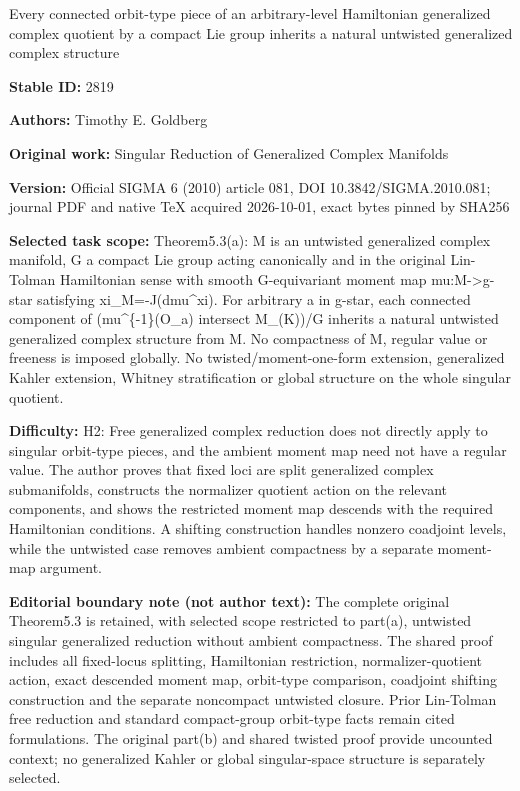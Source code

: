 \documentclass[11pt]{article}
\numberwithin{equation}{section}
\begin{document}
\begin{center}\Large Every connected orbit-type piece of an arbitrary-level Hamiltonian generalized complex quotient by a compact Lie group inherits a natural untwisted generalized complex structure\end{center}
\noindent\textbf{Stable ID:} 2819\par
\noindent\textbf{Authors:} Timothy E. Goldberg\par
\noindent\textbf{Original work:} Singular Reduction of Generalized Complex Manifolds\par
\noindent\textbf{Version:} Official SIGMA 6 (2010) article 081, DOI 10.3842/SIGMA.2010.081; journal PDF and native TeX acquired 2026-10-01, exact bytes pinned by SHA256\par
\noindent\textbf{Selected task scope:} Theorem5.3(a): M is an untwisted generalized complex manifold, G a compact Lie group acting canonically and in the original Lin-Tolman Hamiltonian sense with smooth G-equivariant moment map mu:M->g-star satisfying xi\_M=\allowbreak{}-J(dmu\textasciicircum{}xi). For arbitrary a in g-star, each connected component of (mu\textasciicircum{}\{-1\}(O\_a) intersect M\_(K))/G inherits a natural untwisted generalized complex structure from M. No compactness of M, regular value or freeness is imposed globally. No twisted/moment-one-form extension, generalized Kahler extension, Whitney stratification or global structure on the whole singular quotient.\par
\noindent\textbf{Difficulty:} H2: Free generalized complex reduction does not directly apply to singular orbit-type pieces, and the ambient moment map need not have a regular value. The author proves that fixed loci are split generalized complex submanifolds, constructs the normalizer quotient action on the relevant components, and shows the restricted moment map descends with the required Hamiltonian conditions. A shifting construction handles nonzero coadjoint levels, while the untwisted case removes ambient compactness by a separate moment-map argument.\par
\noindent\textbf{Editorial boundary note (not author text):} The complete original Theorem5.3 is retained, with selected scope restricted to part(a), untwisted singular generalized reduction without ambient compactness. The shared proof includes all fixed-locus splitting, Hamiltonian restriction, normalizer-quotient action, exact descended moment map, orbit-type comparison, coadjoint shifting construction and the separate noncompact untwisted closure. Prior Lin-Tolman free reduction and standard compact-group orbit-type facts remain cited formulations. The original part(b) and shared twisted proof provide uncounted context; no generalized Kahler or global singular-space structure is separately selected.\par
\end{document}
